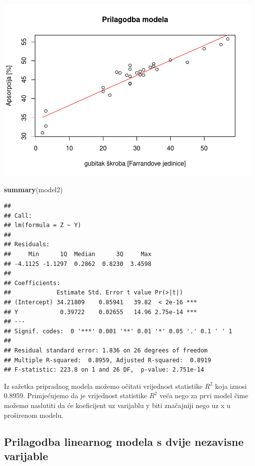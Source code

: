 \documentclass[]{article}
\newenvironment{Shaded}{\begin{snugshade}}{\end{snugshade}}
\newcommand{\KeywordTok}[1]{\textcolor[rgb]{0.13,0.29,0.53}{\textbf{{#1}}}}
\newcommand{\NormalTok}[1]{{#1}}
\begin{document}
\includegraphics{Izvjestaj_files/figure-latex/unnamed-chunk-32-1.pdf}

\begin{Shaded}
\begin{Highlighting}[]
\KeywordTok{summary}\NormalTok{(model2)}
\end{Highlighting}
\end{Shaded}

\begin{verbatim}
## 
## Call:
## lm(formula = Z ~ Y)
## 
## Residuals:
##     Min      1Q  Median      3Q     Max 
## -4.1125 -1.1297  0.2862  0.8230  3.4598 
## 
## Coefficients:
##             Estimate Std. Error t value Pr(>|t|)    
## (Intercept) 34.21809    0.85941   39.82  < 2e-16 ***
## Y            0.39722    0.02655   14.96 2.75e-14 ***
## ---
## Signif. codes:  0 '***' 0.001 '**' 0.01 '*' 0.05 '.' 0.1 ' ' 1
## 
## Residual standard error: 1.836 on 26 degrees of freedom
## Multiple R-squared:  0.8959, Adjusted R-squared:  0.8919 
## F-statistic: 223.8 on 1 and 26 DF,  p-value: 2.751e-14
\end{verbatim}

Iz sažetka pripradnog modela možemo očitati vrijednost statistike
\(R^2\) koja iznosi 0.8959. Primjećujemo da je vrijednost statistike
\(R^2\) veća nego za prvi model čime možemo naslutiti da će koeficijent
uz varijablu y biti značajniji nego uz x u proširenom modelu.

\subsection{Prilagodba linearnog modela s dvije nezavisne
varijable}\label{prilagodba-linearnog-modela-s-dvije-nezavisne-varijable}
\end{document}
